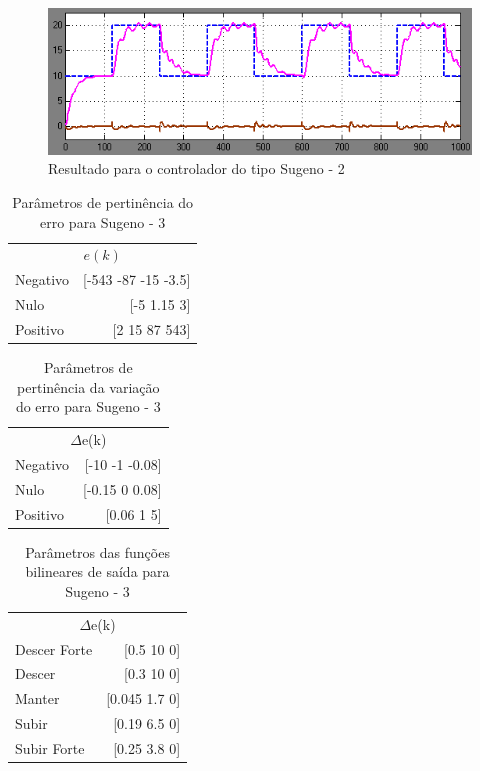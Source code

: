 \documentclass[conference]{IEEEtran}
\begin{document}
\begin{figure}[!h]
    \centering
    \includegraphics[scale=0.2]{sugeno3.png}
    \caption { Resultado para o controlador do tipo Sugeno - 2 }
\end{figure}

\begin{table}[!h]
\caption{Parâmetros de pertinência do erro para Sugeno - 3}
\centering
\begin{tabular}{lr}
\toprule
\multicolumn{2}{c}{$e(k)$} \\
\cmidrule(r){1-2}
Negativo & [-543 -87 -15 -3.5] \\
Nulo & [-5 1.15 3] \\
Positivo & [2 15 87 543] \\
\bottomrule
\end{tabular}
\end{table}

\begin{table}[!h]
\caption{Parâmetros de pertinência da variação do erro para Sugeno - 3}
\centering
\begin{tabular}{lr}
\toprule
\multicolumn{2}{c}{$\Delta$e(k)} \\
\cmidrule(r){1-2}
Negativo & [-10 -1 -0.08] \\
Nulo & [-0.15 0 0.08] \\
Positivo & [0.06 1 5] \\
\bottomrule
\end{tabular}
\end{table}

\begin{table}[!h]
\caption{Parâmetros das funções bilineares de saída para Sugeno - 3}
\centering
\begin{tabular}{lr}
\toprule
\multicolumn{2}{c}{$\Delta$e(k)} \\
\cmidrule(r){1-2}
Descer Forte & [0.5 10 0] \\
Descer & [0.3 10 0] \\
Manter & [0.045 1.7 0] \\
Subir & [0.19 6.5 0] \\
Subir Forte & [0.25 3.8 0] \\
\bottomrule
\end{tabular}
\end{table}
\end{document}
